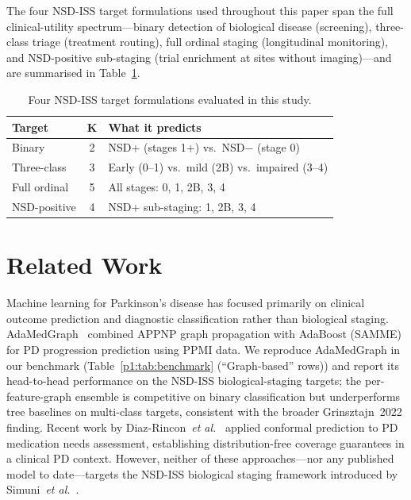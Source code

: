 \noindent The four NSD-ISS target formulations used throughout this paper span the full clinical-utility spectrum---binary detection of biological disease (screening), three-class triage (treatment routing), full ordinal staging (longitudinal monitoring), and NSD-positive sub-staging (trial enrichment at sites without imaging)---and are summarised in Table~\ref{p1:tab:targets}.

\begin{table}[t]
\centering
\caption{Four NSD-ISS target formulations evaluated in this study.}
\label{p1:tab:targets}
\scriptsize
\setlength{\tabcolsep}{3pt}
\begin{tabular}{@{}lcp{4.2cm}@{}}
\toprule
\textbf{Target} & \textbf{K} & \textbf{What it predicts} \\
\midrule
Binary       & 2 & NSD+ (stages 1+) vs.\ NSD$-$ (stage 0) \\
Three-class  & 3 & Early (0--1) vs.\ mild (2B) vs.\ impaired (3--4) \\
Full ordinal & 5 & All stages: 0, 1, 2B, 3, 4 \\
NSD-positive & 4 & NSD+ sub-staging: 1, 2B, 3, 4 \\
\bottomrule
\end{tabular}
\end{table}

\section{Related Work}
\label{p1:sec:related}

Machine learning for Parkinson's disease has focused primarily on clinical outcome prediction and diagnostic classification rather than biological staging. AdaMedGraph~\cite{adamedgraph} combined APPNP graph propagation with AdaBoost (SAMME) for PD progression prediction using PPMI data. We reproduce AdaMedGraph in our benchmark (Table~\ref{p1:tab:benchmark} (``Graph-based'' rows)) and report its head-to-head performance on the NSD-ISS biological-staging targets; the per-feature-graph ensemble is competitive on binary classification but underperforms tree baselines on multi-class targets, consistent with the broader Grinsztajn~2022 finding. Recent work by Diaz-Rincon~\textit{et al.}~\cite{diazrincon2025} applied conformal prediction to PD medication needs assessment, establishing distribution-free coverage guarantees in a clinical PD context. However, neither of these approaches---nor any published model to date---targets the NSD-ISS biological staging framework introduced by Simuni~\textit{et al.}~\cite{simuni2024}.

